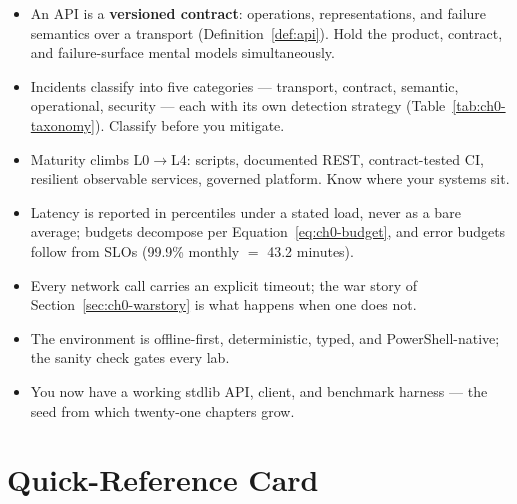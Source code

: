 \begin{itemize}
  \item An API is a \textbf{versioned contract}: operations,
    representations, and failure semantics over a transport
    (Definition~\ref{def:api}). Hold the product, contract, and
    failure-surface mental models simultaneously.
  \item Incidents classify into five categories --- transport, contract,
    semantic, operational, security --- each with its own detection
    strategy (Table~\ref{tab:ch0-taxonomy}). Classify before you mitigate.
  \item Maturity climbs L0$\to$L4: scripts, documented REST, contract-tested
    CI, resilient observable services, governed platform. Know where your
    systems sit.
  \item Latency is reported in percentiles under a stated load, never as a
    bare average; budgets decompose per Equation~\eqref{eq:ch0-budget}, and
    error budgets follow from SLOs (99.9\% monthly $=$ 43.2 minutes).
  \item Every network call carries an explicit timeout; the war story of
    Section~\ref{sec:ch0-warstory} is what happens when one does not.
  \item The environment is offline-first, deterministic, typed, and
    PowerShell-native; the sanity check gates every lab.
  \item You now have a working stdlib API, client, and benchmark harness ---
    the seed from which twenty-one chapters grow.
\end{itemize}

\section{Quick-Reference Card}
\label{sec:ch0-quickref}

